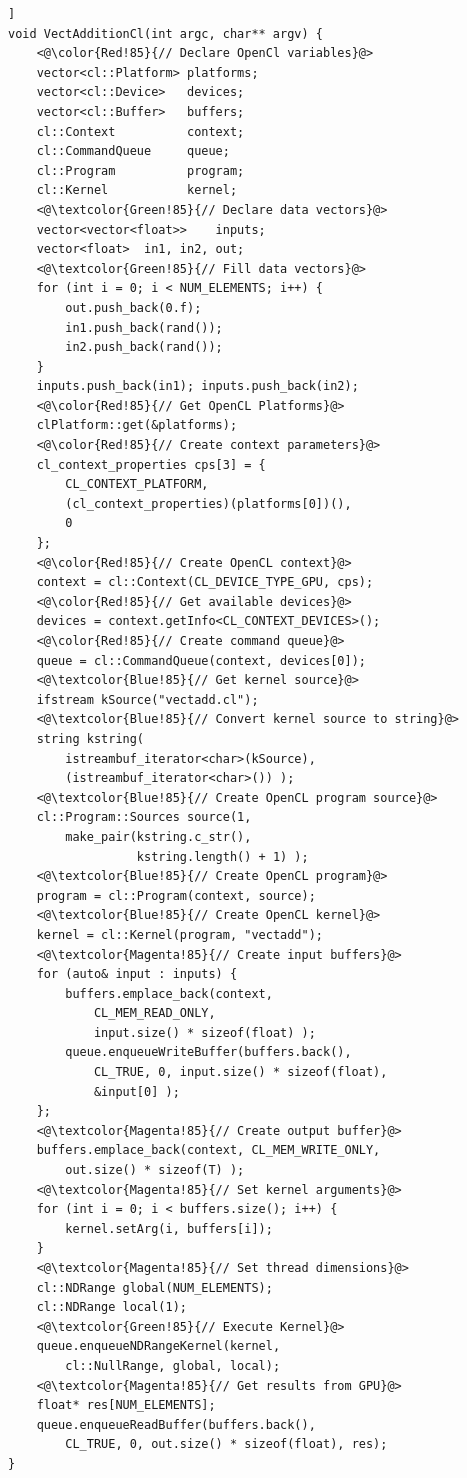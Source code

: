 \documentclass{sig-alternate-05-2015}
\begin{document}
\begin{lstlisting}[caption=Vector addition on the device using
OpenCL which highlights the different cross-cutting components.,label=vectcl,float=[t!]]
void VectAdditionCl(int argc, char** argv) {
	<@\color{Red!85}{// Declare OpenCl variables}@>
	vector<cl::Platform> platforms;
	vector<cl::Device>   devices;
	vector<cl::Buffer>   buffers;
	cl::Context          context;
	cl::CommandQueue     queue;
	cl::Program          program;
	cl::Kernel           kernel;
	<@\textcolor{Green!85}{// Declare data vectors}@>
	vector<vector<float>>    inputs;
	vector<float>  in1, in2, out;
	<@\textcolor{Green!85}{// Fill data vectors}@>
	for (int i = 0; i < NUM_ELEMENTS; i++) {
		out.push_back(0.f);
		in1.push_back(rand());
		in2.push_back(rand());
	}
	inputs.push_back(in1); inputs.push_back(in2);
	<@\color{Red!85}{// Get OpenCL Platforms}@>
	clPlatform::get(&platforms);
	<@\color{Red!85}{// Create context parameters}@>
	cl_context_properties cps[3] = {
		CL_CONTEXT_PLATFORM,
		(cl_context_properties)(platforms[0])(),
		0 
	};
	<@\color{Red!85}{// Create OpenCL context}@>
	context = cl::Context(CL_DEVICE_TYPE_GPU, cps);
	<@\color{Red!85}{// Get available devices}@>
	devices = context.getInfo<CL_CONTEXT_DEVICES>();
	<@\color{Red!85}{// Create command queue}@>
	queue = cl::CommandQueue(context, devices[0]);
	<@\textcolor{Blue!85}{// Get kernel source}@>
	ifstream kSource("vectadd.cl");
	<@\textcolor{Blue!85}{// Convert kernel source to string}@>
	string kstring(
		istreambuf_iterator<char>(kSource),
		(istreambuf_iterator<char>()) );
	<@\textcolor{Blue!85}{// Create OpenCL program source}@>
	cl::Program::Sources source(1, 
		make_pair(kstring.c_str(), 
		          kstring.length() + 1) );
	<@\textcolor{Blue!85}{// Create OpenCL program}@>
	program = cl::Program(context, source);
	<@\textcolor{Blue!85}{// Create OpenCL kernel}@>
	kernel = cl::Kernel(program, "vectadd");
	<@\textcolor{Magenta!85}{// Create input buffers}@>
	for (auto& input : inputs) {
		buffers.emplace_back(context, 
			CL_MEM_READ_ONLY, 
			input.size() * sizeof(float) );
		queue.enqueueWriteBuffer(buffers.back(),
			CL_TRUE, 0, input.size() * sizeof(float),
            &input[0] );
	};
	<@\textcolor{Magenta!85}{// Create output buffer}@>
	buffers.emplace_back(context, CL_MEM_WRITE_ONLY,
		out.size() * sizeof(T) );
	<@\textcolor{Magenta!85}{// Set kernel arguments}@>
	for (int i = 0; i < buffers.size(); i++) {
		kernel.setArg(i, buffers[i]);
	}
	<@\textcolor{Magenta!85}{// Set thread dimensions}@>
	cl::NDRange global(NUM_ELEMENTS);
	cl::NDRange local(1);
	<@\textcolor{Green!85}{// Execute Kernel}@>
	queue.enqueueNDRangeKernel(kernel,
		cl::NullRange, global, local);
	<@\textcolor{Magenta!85}{// Get results from GPU}@>
	float* res[NUM_ELEMENTS];
	queue.enqueueReadBuffer(buffers.back(),
		CL_TRUE, 0, out.size() * sizeof(float), res);
}
\end{lstlisting}
\end{document}
